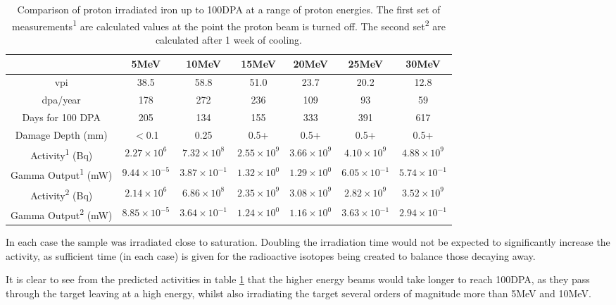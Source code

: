 \FloatBarrier
\begin{table}[h]
\begin{center}
\begin{tabular}{c c c c c c c}
\hline\hline
                     & 5MeV & 10MeV & 15MeV & 20MeV & 25MeV & 30MeV \\
\hline\hline
\acrshort{vpi}       & 38.5  & 58.8  & 51.0  & 23.7   & 20.2  &  12.8  \\
\acrshort{dpa}/year  & 178   & 272   & 236   & 109    & 93    &  59    \\
Days for 100 DPA     & 205   & 134   & 155   & 333    & 391   &  617   \\
Damage Depth (mm)    & $<$0.1  & 0.25  & 0.5+  & 0.5+   & 0.5+  &  0.5+  \\
Activity\textsuperscript{1} (Bq)        & ${2.27} \times 10^{6}$  & ${7.32} \times 10^{8}$  & ${2.55} \times 10^{9}$  & ${3.66} \times 10^{9}$  & ${4.10} \times 10^{9}$ & ${4.88} \times 10^{9}$ \\    
Gamma Output\textsuperscript{1} (mW)    & ${9.44} \times 10^{-5}$  & ${3.87} \times 10^{-1}$  & ${1.32} \times 10^{0}$  & ${1.29} \times 10^{0}$  & ${6.05} \times 10^{-1}$ & ${5.74} \times 10^{-1}$ \\ 
Activity\textsuperscript{2} (Bq)        & ${2.14} \times 10^{6}$  & ${6.86} \times 10^{8}$  & ${2.35} \times 10^{9}$  & ${3.08} \times 10^{9}$  & ${2.82} \times 10^{9}$ & ${3.52} \times 10^{9}$ \\    
Gamma Output\textsuperscript{2} (mW)    & ${8.85} \times 10^{-5}$  & ${3.64} \times 10^{-1}$  & ${1.24} \times 10^{0}$  & ${1.16} \times 10^{0}$  & ${3.63} \times 10^{-1}$ & ${2.94} \times 10^{-1}$ \\ 
\hline\hline
\end{tabular}
\end{center}
\caption{Comparison of proton irradiated iron up to 100DPA at a range of proton energies.  The first set of measurements\textsuperscript{1} are calculated values at the point the proton beam is turned off.  The second set\textsuperscript{2} are calculated after 1 week of cooling.}
\label{tab:activitydpairon}
\end{table}

In each case the sample was irradiated close to saturation.  Doubling the irradiation time would not be expected to significantly increase the activity, as sufficient time (in each case) is given for the radioactive isotopes being created to balance those decaying away. 

It is clear to see from the predicted activities in table \ref{tab:activitydpairon} that the higher energy beams would take longer to reach 100DPA, as they pass through the target leaving at a high energy, whilst also irradiating the target several orders of magnitude more than 5MeV and 10MeV.


